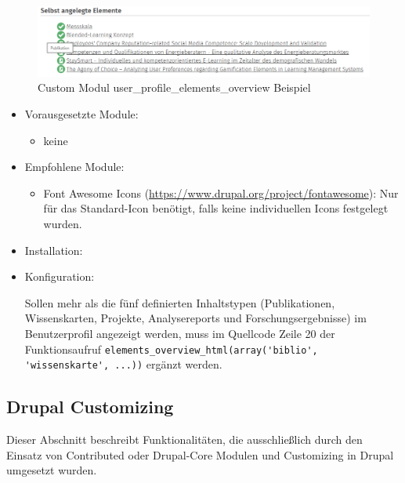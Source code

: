 \begin{figure}[H]
	\centering
	\includegraphics[width=0.80\linewidth]{images/example_userprofile}
	\caption{Custom Modul user\_profile\_elements\_overview Beispiel}
	\label{fig:example_userprofile}
\end{figure}

\begin{itemize}[parsep=0pt, itemsep=5.0pt plus 2.0pt minus 1.0pt, leftmargin=*]
	\item Vorausgesetzte Module:
	\begin{itemize}
		\item keine
	\end{itemize}
	
	\item Empfohlene Module:
	\begin{itemize}
		\item Font Awesome Icons (\url{https://www.drupal.org/project/fontawesome}): Nur für das Standard-Icon benötigt, falls keine individuellen Icons festgelegt wurden.
	\end{itemize}
	
	\item Installation: 
	
	\standardinstall
	
	
	\item Konfiguration:
	
	\noconfig
	
	Sollen mehr als die fünf definierten Inhaltstypen (Publikationen, Wissenskarten, Projekte, Analysereports und Forschungsergebnisse) im Benutzerprofil angezeigt werden, muss im Quellcode Zeile 20 der Funktionsaufruf \lstinline|elements_overview_html(array('biblio', 'wissenskarte', ...))| ergänzt werden.	
\end{itemize}



\newpage
\subsection{Drupal Customizing}\label{sub:drupal_customizing}
Dieser Abschnitt beschreibt Funktionalitäten, die ausschließlich durch den Einsatz von Contributed oder Drupal-Core Modulen und Customizing in Drupal umgesetzt wurden.

